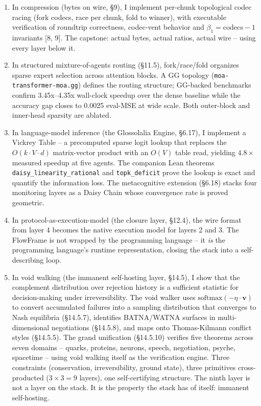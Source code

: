 \documentclass[
  11pt,
]{article}
\begin{document}
\begin{enumerate}
\item
  In compression (bytes on wire, §9), I implement per-chunk topological
  codec racing (fork codecs, race per chunk, fold to winner), with
  executable verification of roundtrip correctness, codec-vent behavior
  and \(\beta_1 = \text{codecs}-1\) invariants {[}8, 9{]}. The capstone:
  actual bytes, actual ratios, actual wire -- using every layer below
  it.
\item
  In structured mixture-of-agents routing (§11.5), fork/race/fold
  organizes sparse expert selection across attention blocks. A GG
  topology (\texttt{moa-transformer-moa.gg}) defines the routing
  structure; GG-backed benchmarks confirm 3.45x--4.35x wall-clock
  speedup over the dense baseline while the accuracy gap closes to
  0.0025 eval-MSE at wide scale. Both outer-block and inner-head
  sparsity are ablated.
\item
  In language-model inference (the Glossolalia Engine, §6.17), I
  implement a Vickrey Table -- a precomputed sparse logit lookup that
  replaces the \(O(k \cdot V \cdot d)\) matrix-vector product with an
  \(O(V)\) table read, yielding \(4.8\times\) measured speedup at five
  agents. The companion Lean theorems
  \texttt{daisy\_linearity\_rational} and \texttt{topk\_deficit} prove
  the lookup is exact and quantify the information loss. The
  metacognitive extension (§6.18) stacks four monitoring layers as a
  Daisy Chain whose convergence rate is proved geometric.
\item
  In protocol-as-execution-model (the closure layer, §12.4), the wire
  format from layer 4 becomes the native execution model for layers 2
  and 3. The FlowFrame is not wrapped by the programming language -- it
  \emph{is} the programming language's runtime representation, closing
  the stack into a self-describing loop.
\item
  In void walking (the immanent self-hosting layer, §14.5), I show that
  the complement distribution over rejection history is a sufficient
  statistic for decision-making under irreversibility. The void walker
  uses \(\text{softmax}(-\eta \cdot \mathbf{v})\) to convert accumulated
  failures into a sampling distribution that converges to Nash
  equilibria (§14.5.7), identifies BATNA/WATNA surfaces in
  multi-dimensional negotiations (§14.5.8), and maps onto Thomas-Kilmann
  conflict styles (§14.5.5). The grand unification (§14.5.10) verifies
  five theorems across seven domains -- quarks, proteins, neurons,
  speech, negotiation, psyche, spacetime -- using void walking itself as
  the verification engine. Three constraints (conservation,
  irreversibility, ground state), three primitives cross-producted
  (\(3 \times 3 = 9\) layers), one self-certifying structure. The ninth
  layer is not a layer on the stack. It is the property the stack has of
  itself: immanent self-hosting.
\end{enumerate}
\end{document}
